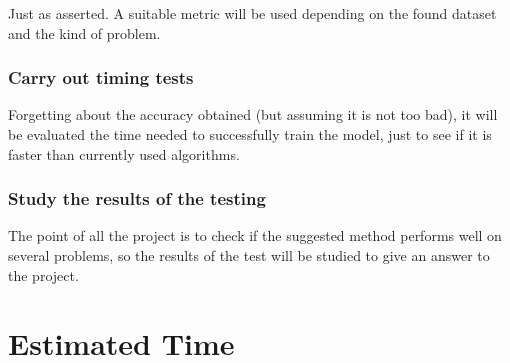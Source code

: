 \documentclass[a4paper]{article}
\begin{document}
        Just as asserted. A suitable metric will be used depending on the found dataset and the kind of problem.

        \subsubsection{Carry out timing tests}

        Forgetting about the accuracy obtained (but assuming it is not too bad), it will be evaluated the time needed to successfully train the model, just to see if it is faster than currently used algorithms.

        \subsubsection{Study the results of the testing}

        The point of all the project is to check if the suggested method performs well on several problems, so the results of the test will be studied to give an answer to the project.







    \section{Estimated Time}
\end{document}
